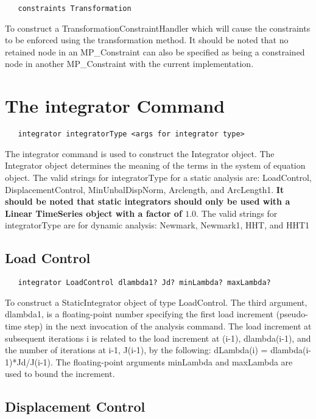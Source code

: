 \documentclass[12pt]{article}
\begin{document}
{\sf\small
\begin{verbatim}
   constraints Transformation 
\end{verbatim}
}

\noindent To construct a TransformationConstraintHandler which will cause the
constraints to be enforced using the transformation method. It should be noted
that no retained node in an MP\_Constraint can also be specified as being a
constrained node in another MP\_Constraint with the current implementation.

\section {The integrator Command}
{\sf\small
\begin{verbatim}
   integrator integratorType <args for integrator type>
\end{verbatim}
}

The integrator command is used to construct the Integrator
object. The Integrator object determines the meaning of the terms in
the system of equation object. The valid strings for
integratorType for a static analysis are: LoadControl,
DisplacementControl, MinUnbalDispNorm, Arclength, and ArcLength1.
{\bf It should be noted that static
integrators should only be used with a Linear TimeSeries object with a
factor of $1.0$}. The valid strings for integratorType are for dynamic
analysis: Newmark, Newmark1, HHT, and HHT1

\subsection{Load Control}

{\sf\small
\begin{verbatim}
   integrator LoadControl dlambda1? Jd? minLambda? maxLambda?
\end{verbatim}
}

To construct a StaticIntegrator object of type LoadControl. The third
argument, dlambda1, is a floating-point number specifying the first
load increment (pseudo-time step) in the next invocation of the
analysis command. The load increment at subsequent iterations i is
related to the load increment at (i-1), dlambda(i-1), and the number
of iterations at i-1, J(i-1), by the following: dLambda(i) =
dlambda(i-1)*Jd/J(i-1). The floating-point arguments minLambda and
maxLambda are used to bound the increment.

\subsection{Displacement Control}
\end{document}
